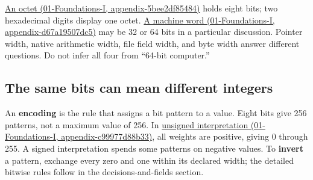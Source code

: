 \href{../01-Foundations-I/main.pdf\#nameddest=appendix-5bee2df85484}{An octet (01-Foundations-I, appendix-5bee2df85484)} holds eight bits; two hexadecimal digits display one octet. \href{../01-Foundations-I/main.pdf\#nameddest=appendix-d67a19507dc5}{A machine word (01-Foundations-I, appendix-d67a19507dc5)} may be 32 or 64 bits in a particular discussion. Pointer width, native arithmetic width, file field width, and byte width answer different questions. Do not infer all four from ``64-bit computer.''

\subsection{The same bits can mean different integers}\label{05-engine-i-ch001-the-same-bits-can-mean-different-integers}

An \textbf{encoding} is the rule that assigns a bit pattern to a value. Eight bits give 256 patterns, not a maximum value of 256. In \href{../01-Foundations-I/main.pdf\#nameddest=appendix-c99977d88b33}{unsigned interpretation (01-Foundations-I, appendix-c99977d88b33)}, all weights are positive, giving 0 through 255. A signed interpretation spends some patterns on negative values. To \textbf{invert} a pattern, exchange every zero and one within its declared width; the detailed bitwise rules follow in the decisions-and-fields section.

